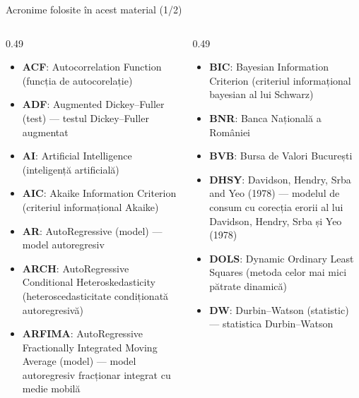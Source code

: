 {
\begin{frame}[noframenumbering]
    \titlepage
\end{frame}
}
\begin{frame}{Acronime folosite în acest material (1/2)}
\begin{columns}[T]
\begin{column}{0.49\textwidth}
\begin{itemize}\setlength{\itemsep}{0pt}
    \item \textbf{ACF}: Autocorrelation Function (funcția de autocorelație)
    \item \textbf{ADF}: Augmented Dickey–Fuller (test) — testul Dickey–Fuller augmentat
    \item \textbf{AI}: Artificial Intelligence (inteligență artificială)
    \item \textbf{AIC}: Akaike Information Criterion (criteriul informațional Akaike)
    \item \textbf{AR}: AutoRegressive (model) — model autoregresiv
    \item \textbf{ARCH}: AutoRegressive Conditional Heteroskedasticity (heteroscedasticitate condiționată autoregresivă)
    \item \textbf{ARFIMA}: AutoRegressive Fractionally Integrated Moving Average (model) — model autoregresiv fracționar integrat cu medie mobilă
\end{itemize}
\end{column}
\begin{column}{0.49\textwidth}
\begin{itemize}\setlength{\itemsep}{0pt}
    \item \textbf{BIC}: Bayesian Information Criterion (criteriul informațional bayesian al lui Schwarz)
    \item \textbf{BNR}: Banca Națională a României
    \item \textbf{BVB}: Bursa de Valori București
    \item \textbf{DHSY}: Davidson, Hendry, Srba and Yeo (1978) — modelul de consum cu corecția erorii al lui Davidson, Hendry, Srba și Yeo (1978)
    \item \textbf{DOLS}: Dynamic Ordinary Least Squares (metoda celor mai mici pătrate dinamică)
    \item \textbf{DW}: Durbin–Watson (statistic) — statistica Durbin–Watson
\end{itemize}
\end{column}
\end{columns}
\end{frame}
